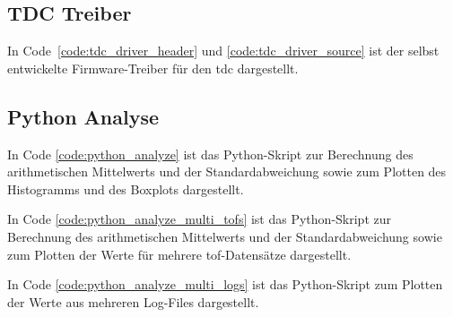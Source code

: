 \subsection{TDC Treiber}\label{sec:tdc_driver}

In Code~\ref{code:tdc_driver_header} und \ref{code:tdc_driver_source} ist der selbst entwickelte Firmware-Treiber für
den \acrshort{tdc} dargestellt.




\subsection{Python Analyse}\label{sec:python_analyze}

In Code \ref{code:python_analyze} ist das Python-Skript zur Berechnung des arithmetischen Mittelwerts und der
Standardabweichung sowie zum Plotten des Histogramms und des Boxplots dargestellt.



In Code \ref{code:python_analyze_multi_tofs} ist das Python-Skript zur Berechnung des arithmetischen Mittelwerts und der
Standardabweichung sowie zum Plotten der Werte für mehrere \acrshort{tof}-Datensätze dargestellt.



In Code \ref{code:python_analyze_multi_logs} ist das Python-Skript zum Plotten der Werte aus mehreren Log-Files
dargestellt.



\pagebreak


